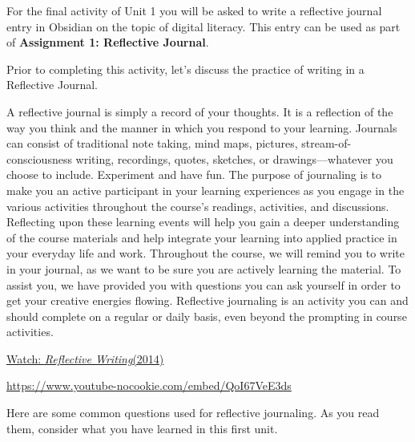 \documentclass[
  letterpaper,
  DIV=11,
  numbers=noendperiod]{scrreprt}
\begin{document}
\begin{tcolorbox}[enhanced jigsaw, toprule=.15mm, colback=white, colframe=quarto-callout-note-color-frame, bottomtitle=1mm, leftrule=.75mm, coltitle=black, titlerule=0mm, rightrule=.15mm, colbacktitle=quarto-callout-note-color!10!white, left=2mm, title={Learning Activity}, opacitybacktitle=0.6, opacityback=0, breakable, toptitle=1mm, arc=.35mm, bottomrule=.15mm]

For the final activity of Unit 1 you will be asked to write a reflective
journal entry in Obsidian on the topic of digital literacy. This entry
can be used as part of \textbf{Assignment 1: Reflective Journal}.

Prior to completing this activity, let's discuss the practice of writing
in a Reflective Journal.

A reflective journal is simply a record of your thoughts. It is a
reflection of the way you think and the manner in which you respond to
your learning. Journals can consist of traditional note taking, mind
maps, pictures, stream-of-consciousness writing, recordings, quotes,
sketches, or drawings---whatever you choose to include. Experiment and
have fun. The purpose of journaling is to make you an active participant
in your learning experiences as you engage in the various activities
throughout the course's readings, activities, and discussions.
Reflecting upon these learning events will help you gain a deeper
understanding of the course materials and help integrate your learning
into applied practice in your everyday life and work. Throughout the
course, we will remind you to write in your journal, as we want to be
sure you are actively learning the material. To assist you, we have
provided you with questions you can ask yourself in order to get your
creative energies flowing. Reflective journaling is an activity you can
and should complete on a regular or daily basis, even beyond the
prompting in course activities.

\href{https://www.youtube.com/watch?v=QoI67VeE3ds}{Watch:
\emph{Reflective Writing}(2014)}

\url{https://www.youtube-nocookie.com/embed/QoI67VeE3ds}

Here are some common questions used for reflective journaling. As you
read them, consider what you have learned in this first unit.


\end{tcolorbox}
\end{document}
